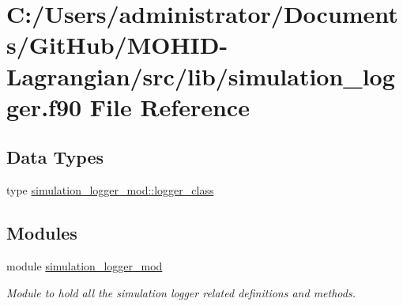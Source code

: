 \hypertarget{simulation__logger_8f90}{}\section{C\+:/\+Users/administrator/\+Documents/\+Git\+Hub/\+M\+O\+H\+I\+D-\/\+Lagrangian/src/lib/simulation\+\_\+logger.f90 File Reference}
\label{simulation__logger_8f90}
\subsection*{Data Types}
\begin{DoxyCompactItemize}
\item 
type \mbox{\hyperlink{structsimulation__logger__mod_1_1logger__class}{simulation\+\_\+logger\+\_\+mod\+::logger\+\_\+class}}
\end{DoxyCompactItemize}
\subsection*{Modules}
\begin{DoxyCompactItemize}
\item 
module \mbox{\hyperlink{namespacesimulation__logger__mod}{simulation\+\_\+logger\+\_\+mod}}
\begin{DoxyCompactList}\small\item\em Module to hold all the simulation logger related definitions and methods. \end{DoxyCompactList}\end{DoxyCompactItemize}
